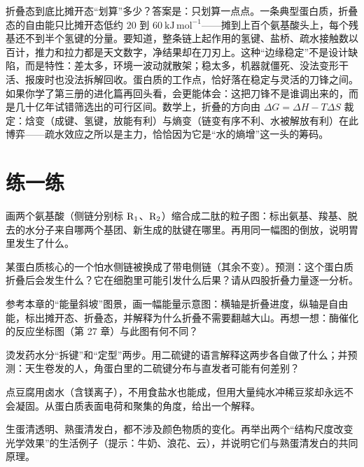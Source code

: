 \begin{tiaozhan}
折叠态到底比摊开态“划算”多少？答案是：只划算一点点。一条典型蛋白质，折叠态的自由能只比摊开态低约 $20$ 到 $60\ \mathrm{kJ\,mol^{-1}}$——摊到上百个氨基酸头上，每个残基还不到半个氢键的分量。要知道，整条链上起作用的氢键、盐桥、疏水接触数以百计，推力和拉力都是天文数字，净结果却在刀刃上。这种“边缘稳定”不是设计缺陷，而是特性：差太多，环境一波动就散架；稳太多，机器就僵死、没法变形干活、报废时也没法拆解回收。蛋白质的工作点，恰好落在稳定与灵活的刀锋之间。如果你学了第三册的进化篇再回头看，会更能体会：这把刀锋不是谁调出来的，而是几十亿年试错筛选出的可行区间。数学上，折叠的方向由 $\Delta G=\Delta H-T\Delta S$ 裁定：焓变（成键、氢键，放能有利）与熵变（链变有序不利、水被解放有利）在此博弈——疏水效应之所以是主力，恰恰因为它是“水的熵增”这一头的筹码。
\end{tiaozhan}

\section*{练一练}

\begin{sikaoti}
\item 画两个氨基酸（侧链分别标 $\mathrm{R_1}$、$\mathrm{R_2}$）缩合成二肽的粒子图：标出氨基、羧基、脱去的水分子来自哪两个基团、新生成的肽键在哪里。再用同一幅图的倒放，说明胃里发生了什么。
\item 某蛋白质核心的一个怕水侧链被换成了带电侧链（其余不变）。预测：这个蛋白质折叠后会发生什么？它在细胞里可能引发什么后果？请从四股折叠力量逐一分析。
\item 参考本章的“能量斜坡”图景，画一幅能量示意图：横轴是折叠进度，纵轴是自由能，标出摊开态、折叠态，并解释为什么折叠不需要翻越大山。再想一想：酶催化的反应坐标图（第 27 章）与此图有何不同？
\item 烫发药水分“拆键”和“定型”两步。用二硫键的语言解释这两步各自做了什么；并预测：天生卷发的人，角蛋白里的二硫键分布与直发者可能有何差别？
\item 点豆腐用卤水（含镁离子），不用食盐水也能成，但用大量纯水冲稀豆浆却永远不会凝固。从蛋白质表面电荷和聚集的角度，给出一个解释。
\item 生蛋清透明、熟蛋清发白，都不涉及颜色物质的变化。再举出两个“结构尺度改变光学效果”的生活例子（提示：牛奶、浪花、云），并说明它们与熟蛋清发白的共同原理。
\end{sikaoti}
